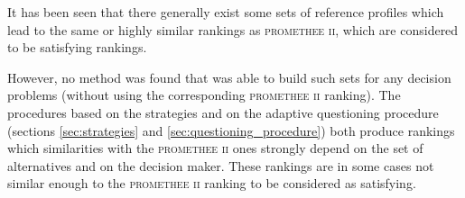 It has been seen that there generally exist some sets of reference profiles which lead to the same or highly similar rankings as \textsc{promethee ii}, which are considered to be satisfying rankings.

\newpage
However, no method was found that was able to build such sets for any decision problems (without using the corresponding \textsc{promethee ii} ranking).
The procedures based on the strategies and on the adaptive questioning procedure (sections \ref{sec:strategies} and \ref{sec:questioning_procedure}) both produce rankings which similarities with the \textsc{promethee ii} ones strongly depend on the set of alternatives and on the decision maker.
These rankings are in some cases not similar enough to the \textsc{promethee ii} ranking to be considered as satisfying.



